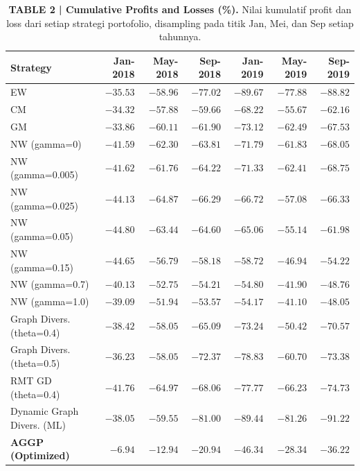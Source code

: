 \documentclass[12pt,a4paper]{article}
\begin{document}
\begin{table}[h!]
    \centering
    \footnotesize
    \setlength{\tabcolsep}{4pt}
    \caption{\textbf{TABLE 2 | Cumulative Profits and Losses (\%).} Nilai kumulatif profit dan loss dari setiap strategi portofolio, disampling pada titik Jan, Mei, dan Sep setiap tahunnya.}
    \begin{tabular}{lrrrrrr}
        \toprule
        \textbf{Strategy} & \textbf{Jan-2018} & \textbf{May-2018} & \textbf{Sep-2018} & \textbf{Jan-2019} & \textbf{May-2019} & \textbf{Sep-2019} \\
        \midrule
        EW                          & $-35.53$ & $-58.96$ & $-77.02$ & $-89.67$ & $-77.88$ & $-88.82$ \\
        CM                          & $-34.32$ & $-57.88$ & $-59.66$ & $-68.22$ & $-55.67$ & $-62.16$ \\
        GM                          & $-33.86$ & $-60.11$ & $-61.90$ & $-73.12$ & $-62.49$ & $-67.53$ \\
        NW (gamma=0)                & $-41.59$ & $-62.30$ & $-63.81$ & $-71.79$ & $-61.83$ & $-68.05$ \\
        NW (gamma=0.005)            & $-41.62$ & $-61.76$ & $-64.22$ & $-71.33$ & $-62.41$ & $-68.75$ \\
        NW (gamma=0.025)            & $-44.13$ & $-64.87$ & $-66.29$ & $-66.72$ & $-57.08$ & $-66.33$ \\
        NW (gamma=0.05)             & $-44.80$ & $-63.44$ & $-64.60$ & $-65.06$ & $-55.14$ & $-61.98$ \\
        NW (gamma=0.15)             & $-44.65$ & $-56.79$ & $-58.18$ & $-58.72$ & $-46.94$ & $-54.22$ \\
        NW (gamma=0.7)              & $-40.13$ & $-52.75$ & $-54.21$ & $-54.80$ & $-41.90$ & $-48.76$ \\
        NW (gamma=1.0)              & $-39.09$ & $-51.94$ & $-53.57$ & $-54.17$ & $-41.10$ & $-48.05$ \\
        Graph Divers. (theta=0.4)   & $-38.42$ & $-58.05$ & $-65.09$ & $-73.24$ & $-50.42$ & $-70.57$ \\
        Graph Divers. (theta=0.5)   & $-36.23$ & $-58.05$ & $-72.37$ & $-78.83$ & $-60.70$ & $-73.38$ \\
        RMT GD (theta=0.4)          & $-41.76$ & $-64.97$ & $-68.06$ & $-77.77$ & $-66.23$ & $-74.73$ \\
        Dynamic Graph Divers. (ML)  & $-38.05$ & $-59.55$ & $-81.00$ & $-89.44$ & $-81.26$ & $-91.22$ \\
        \textbf{AGGP (Optimized)}   & $\mathbf{-6.94}$ & $\mathbf{-12.94}$ & $\mathbf{-20.94}$ & $\mathbf{-46.34}$ & $\mathbf{-28.34}$ & $\mathbf{-36.22}$ \\
        \bottomrule
    \end{tabular}
\end{table}
\end{document}
